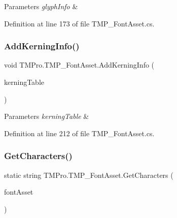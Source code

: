 \begin{DoxyParams}{Parameters}
{\em glyph\+Info} & \\
\hline
\end{DoxyParams}


Definition at line 173 of file T\+M\+P\+\_\+\+Font\+Asset.\+cs.

\mbox{\label{class_t_m_pro_1_1_t_m_p___font_asset_a45942ff82434c0e1e07f830b1d0c2af0}} 
\subsubsection{\texorpdfstring{AddKerningInfo()}{AddKerningInfo()}}
{\footnotesize\ttfamily void T\+M\+Pro.\+T\+M\+P\+\_\+\+Font\+Asset.\+Add\+Kerning\+Info (\begin{DoxyParamCaption}\item[{\mbox{\hyperlink{class_t_m_pro_1_1_kerning_table}{Kerning\+Table}}}]{kerning\+Table }\end{DoxyParamCaption})}






\begin{DoxyParams}{Parameters}
{\em kerning\+Table} & \\
\hline
\end{DoxyParams}


Definition at line 212 of file T\+M\+P\+\_\+\+Font\+Asset.\+cs.

\mbox{\label{class_t_m_pro_1_1_t_m_p___font_asset_a41da35d4c071829fecb1c8af92076969}} 
\subsubsection{\texorpdfstring{GetCharacters()}{GetCharacters()}}
{\footnotesize\ttfamily static string T\+M\+Pro.\+T\+M\+P\+\_\+\+Font\+Asset.\+Get\+Characters (\begin{DoxyParamCaption}\item[{\mbox{\hyperlink{class_t_m_pro_1_1_t_m_p___font_asset}{T\+M\+P\+\_\+\+Font\+Asset}}}]{font\+Asset }\end{DoxyParamCaption})\hspace{0.3cm}{\ttfamily [static]}}



